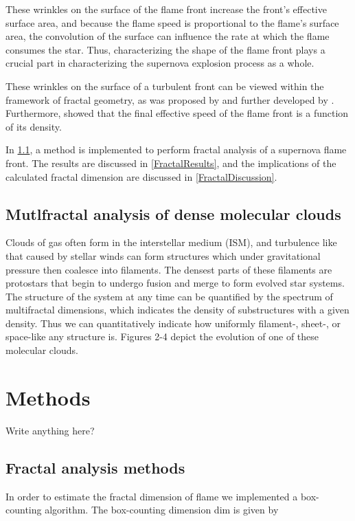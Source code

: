 \documentclass[iop]{emulateapj}
\begin{document}
These wrinkles on the surface of the flame front increase the front's effective surface area, and because the flame speed is proportional to the flame's surface area, the convolution of the surface can influence the rate at which the flame consumes the star. Thus, characterizing the shape of the flame front plays a crucial part in characterizing the supernova explosion process as a whole. 

These wrinkles on the surface of a turbulent front can be viewed within the framework of fractal geometry, as was proposed by \cite{Mandelbrot1975} and further developed by \cite{Timmes1994}. Furthermore, \cite{Timmes1994} showed that the final effective speed of the flame front is a function of its density.

In \textsection \ref{FractalMethods}, a method is implemented to perform fractal analysis of a supernova flame front. The results are discussed in \textsection \ref{FractalResults}, and the implications of the calculated fractal dimension are discussed in \textsection \ref{FractalDiscussion}.


\subsection{Mutlfractal analysis of dense molecular clouds}
Clouds of gas often form in the interstellar medium (ISM), and turbulence like that caused by stellar winds can form structures which under gravitational pressure then coalesce into filaments. The densest parts of these filaments are protostars that begin to undergo fusion and merge to form evolved star systems. The structure of the system at any time can be quantified by the spectrum of multifractal dimensions, which indicates the density of substructures with a given density. Thus we can quantitatively indicate how uniformly filament-, sheet-, or space-like any structure is. Figures 2-4 depict the evolution of one of these molecular clouds.

\section{Methods}\label{Methods}
{\Large{} Write anything here?}

\subsection{Fractal analysis methods}\label{FractalMethods}
In order to estimate the fractal dimension of flame we implemented a box-counting algorithm. The box-counting dimension dim is given by
\end{document}
